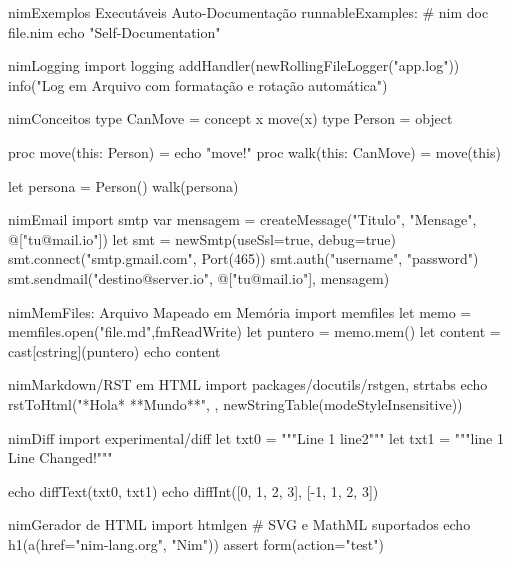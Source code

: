 \documentclass[10pt, a4paper]{article}
\begin{document}
\begin{multicols}{4}
\begin{codebox}{nim}{Exemplos Executáveis Auto-Documentação}
runnableExamples: # nim doc file.nim
  echo "Self-Documentation"
\end{codebox}


\begin{codebox}{nim}{Logging}
import logging
addHandler(newRollingFileLogger("app.log"))
info("Log em Arquivo com formatação e rotação automática")
\end{codebox}


\begin{codebox}{nim}{Conceitos}
type CanMove = concept x
  move(x)
type Person = object

proc move(this: Person) = echo "move!"
proc walk(this: CanMove) = move(this)

let persona = Person()
walk(persona)
\end{codebox}


\begin{codebox}{nim}{Email}
import smtp
var mensagem = createMessage("Titulo", "Mensage",  @["tu@mail.io"])
let smt = newSmtp(useSsl=true, debug=true)
smt.connect("smtp.gmail.com", Port(465))
smt.auth("username", "password")
smt.sendmail("destino@server.io", @["tu@mail.io"], mensagem)
\end{codebox}


\begin{codebox}{nim}{MemFiles: Arquivo Mapeado em Memória}
import memfiles
let memo = memfiles.open("file.md",fmReadWrite)
let puntero = memo.mem()
let content = cast[cstring](puntero)
echo content
\end{codebox}


\begin{codebox}{nim}{Markdown/RST em HTML}
import packages/docutils/rstgen, strtabs
echo rstToHtml("*Hola* **Mundo**", {}, newStringTable(modeStyleInsensitive))
\end{codebox}


\begin{codebox}{nim}{Diff}
import experimental/diff
let txt0 = """Line 1
line2"""
let txt1 = """line 1
Line Changed!"""

echo diffText(txt0, txt1)
echo diffInt([0, 1, 2, 3], [-1, 1, 2, 3])
\end{codebox}


\begin{codebox}{nim}{Gerador de HTML}
import htmlgen # SVG e MathML suportados
echo h1(a(href="nim-lang.org", "Nim"))
assert form(action="test")
\end{codebox}



\end{multicols}
\end{document}
